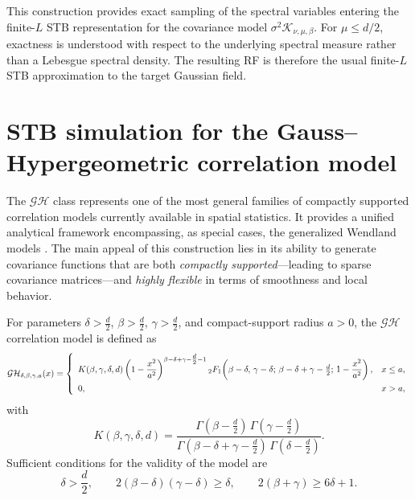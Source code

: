 \documentclass[
  12pt]{article}
\begin{document}
This construction provides exact sampling of the spectral variables entering the finite-$L$ STB representation for the covariance model $\sigma^2\mathcal{K}_{\nu,\mu,\beta}$.
For $\mu\le d/2$, exactness is understood with respect to the underlying spectral measure rather than a Lebesgue spectral density.
The resulting RF is therefore the usual finite-$L$ STB approximation to the target Gaussian field.

\section{STB simulation for the Gauss--Hypergeometric correlation model}
\label{sec5}

The $\mathcal{GH}$ class \citep{emery2022gauss,hyp2025} represents one of the most general families of compactly supported correlation models currently available in spatial statistics.
It provides a unified analytical framework encompassing, as special cases, the generalized Wendland models \citep{gnei02,BFFP}. The main appeal of this construction lies in its ability to generate covariance functions that are both \emph{compactly supported}---leading to sparse covariance matrices---and \emph{highly flexible} in terms of smoothness and local behavior.

For parameters $\delta>\tfrac{d}{2}$, $\beta>\tfrac{d}{2}$, $\gamma>\tfrac{d}{2}$, and compact-support radius $a>0$, the $\mathcal{GH}$ correlation model is defined as \citep{emery2022gauss}
\begin{equation}\label{eq:GH-def}
\scalebox{0.9}{$
\mathcal{GH}_{\delta,\beta,\gamma,a}(x)
=
\left\{
\begin{array}{ll}
\displaystyle
K(\beta,\gamma,\delta,d)\left(1-\frac{x^2}{a^2}\right)^{\beta-\delta+\gamma-\tfrac d2-1}
{}_{2}F_{1}\!\left(\beta-\delta,\,\gamma-\delta;\,
\beta-\delta+\gamma-\tfrac d2;\,
1-\frac{x^2}{a^2}\right),
&  x \leq a, \\[10pt]
0, & x>a,
\end{array}
\right.
$}
\end{equation}
with
\[
K(\beta,\gamma,\delta,d)=
\frac{\Gamma(\beta-\tfrac d2)\,\Gamma(\gamma-\tfrac d2)}
{\Gamma(\beta-\delta+\gamma-\tfrac d2)\,\Gamma(\delta-\tfrac d2)}.
\]
Sufficient conditions for the validity of the model are
\begin{equation}\label{eq:GH-cond}
\delta > \frac{d}{2},
\qquad
2(\beta-\delta)(\gamma-\delta) \geq \delta,
\qquad
2(\beta+\gamma) \geq 6\delta + 1.
\end{equation}
\end{document}
